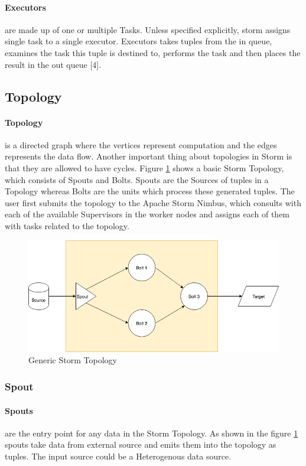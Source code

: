 \documentclass[runningheads,a4paper]{llncs}[2015/06/24]
\begin{document}
\paragraph{Executors} are made up of one or multiple Tasks. Unless specified explicitly, storm assigns single task to a single executor. Executors takes tuples from the in queue, examines the task this tuple is destined to, performs the task and then places the result in the out queue [4].

\subsection{Topology}
\paragraph{Topology} is a directed graph where the vertices represent computation and the edges represents the data flow. Another important thing about topologies in Storm is that they are allowed to have cycles. Figure \ref{fig:topo} shows a basic Storm Topology, which consists of Spouts and Bolts. Spouts are the Sources of tuples in a Topology whereas Bolts are the units which process these generated tuples. The user first submits the topology to the Apache Storm Nimbus, which consults with each of the available Supervisors in the worker nodes and assigns each of them with tasks related to the topology.

\begin{figure}
  \begin{center}
    \includegraphics[width=.7\textwidth]{topo.png}
    \caption{Generic Storm Topology}
    \label{fig:topo}
   \end{center}
\end{figure}

\subsubsection{Spout} 
\paragraph{Spouts} are the entry point for any data in the Storm Topology. As shown in the figure \ref{fig:topo} spouts take data from external source and emits them into the topology as tuples. The input source could be a Heterogenous data source.
\end{document}
